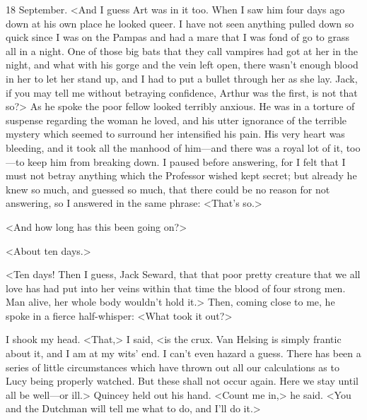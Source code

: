 \begin{diary}{18 September.}
<And I guess Art was in it too. When I saw him four days ago down at his own place he looked queer. I have not seen anything pulled down so quick since I was on the Pampas and had a mare that I was fond of go to grass all in a night. One of those big bats that they call vampires had got at her in the night, and what with his gorge and the vein left open, there wasn't enough blood in her to let her stand up, and I had to put a bullet through her as she lay. Jack, if you may tell me without betraying confidence, Arthur was the first, is not that so?> As he spoke the poor fellow looked terribly anxious. He was in a torture of suspense regarding the woman he loved, and his utter ignorance of the terrible mystery which seemed to surround her intensified his pain. His very heart was bleeding, and it took all the manhood of him—and there was a royal lot of it, too—to keep him from breaking down. I paused before answering, for I felt that I must not betray anything which the Professor wished kept secret; but already he knew so much, and guessed so much, that there could be no reason for not answering, so I answered in the same phrase: <That's so.>

<And how long has this been going on?>

<About ten days.>

<Ten days! Then I guess, Jack Seward, that that poor pretty creature that we all love has had put into her veins within that time the blood of four strong men. Man alive, her whole body wouldn't hold it.> Then, coming close to me, he spoke in a fierce half-whisper: <What took it out?>

I shook my head. <That,> I said, <is the crux. Van Helsing is simply frantic about it, and I am at my wits' end. I can't even hazard a guess. There has been a series of little circumstances which have thrown out all our calculations as to Lucy being properly watched. But these shall not occur again. Here we stay until all be well—or ill.> Quincey held out his hand. <Count me in,> he said. <You and the Dutchman will tell me what to do, and I'll do it.>


\end{diary}
